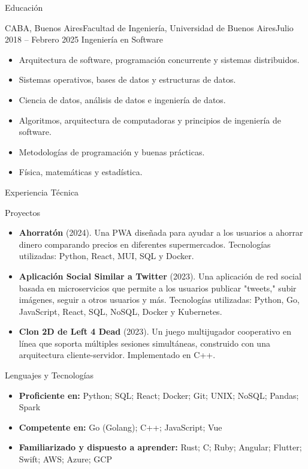 \documentclass[]{mcdowellcv}
\begin{document}
	\begin{cvsection}{Educación}
		\begin{cvsubsection}{CABA, Buenos Aires}{Facultad de Ingeniería, Universidad de Buenos Aires}{Julio 2018 -- Febrero 2025}
			Ingeniería en Software
			\begin{itemize}
				\item Arquitectura de software, programación concurrente y sistemas distribuidos.
				\item Sistemas operativos, bases de datos y estructuras de datos.
				\item Ciencia de datos, análisis de datos e ingeniería de datos.
				\item Algoritmos, arquitectura de computadoras y principios de ingeniería de software.
				\item Metodologías de programación y buenas prácticas.
				\item Física, matemáticas y estadística.
			\end{itemize}
		\end{cvsubsection}
	\end{cvsection}	
	
	\begin{cvsection}{Experiencia Técnica}
		\begin{cvsubsection}{Proyectos}{}{}
			\begin{itemize}
				\item \textbf{Ahorratón} (2024). Una PWA diseñada para ayudar a los usuarios a ahorrar dinero comparando precios en diferentes supermercados. Tecnologías utilizadas: Python, React, MUI, SQL y Docker.
				\item \textbf{Aplicación Social Similar a Twitter} (2023). Una aplicación de red social basada en microservicios que permite a los usuarios publicar "tweets," subir imágenes, seguir a otros usuarios y más. Tecnologías utilizadas: Python, Go, JavaScript, React, SQL, NoSQL, Docker y Kubernetes.
				\item \textbf{Clon 2D de Left 4 Dead} (2023). Un juego multijugador cooperativo en línea que soporta múltiples sesiones simultáneas, construido con una arquitectura cliente-servidor. Implementado en C++.
			\end{itemize}
		\end{cvsubsection}
	\end{cvsection}
	
	\begin{cvsection}{Lenguajes y Tecnologías}
		\begin{cvsubsection}{}{}{}
			\begin{itemize}
				\item \textbf{Proficiente en:}
				\subitem Python; SQL; React; Docker; Git; UNIX; NoSQL; Pandas; Spark
				\item \textbf{Competente en:}
				\subitem Go (Golang); C++; JavaScript; Vue
				\item \textbf{Familiarizado y dispuesto a aprender:}
				\subitem Rust; C; Ruby; Angular; Flutter; Swift; AWS; Azure; GCP
			\end{itemize}
		\end{cvsubsection}
	\end{cvsection}
	
	
\end{document}
